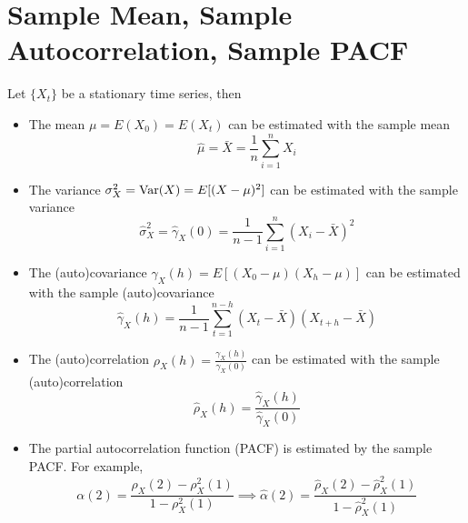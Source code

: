 \chapter{Sample Mean, Sample Autocorrelation, Sample PACF}

Let $\{X_t\}$ be a stationary time series, then 
\begin{itemize}
    \item The mean $\mu = E(X_0) = E(X_t)$ can be estimated with the sample mean
    \[\hat{\mu} = \bar{X} = \frac{1}{n}\sum_{i=1}^n X_i\]
    \item The variance $\sigma_X^2 = \operatorname{Var}(X) = E[(X-\mu)^2]$ can be estimated with the sample variance
    \[\hat{\sigma}_X^2 = \hat{\gamma}_X(0) = \frac{1}{n-1}\sum_{i=1}^n(X_i-\bar{X})^2\]
    \item The (auto)covariance $\gamma_X(h) = E[(X_0 - \mu)(X_h - \mu)]$ can be estimated with the sample (auto)covariance
    \[\hat{\gamma}_X(h) = \frac{1}{n-1}\sum_{t=1}^{n-h}(X_t - \bar{X})(X_{t+h} - \bar{X})\]
    \item The (auto)correlation $\rho_X(h) = \frac{\gamma_X(h)}{\gamma_X(0)}$ can be estimated with the sample (auto)correlation 
    \[\hat{\rho}_X(h) = \frac{\hat{\gamma}_X(h)}{\hat{\gamma}_X(0)}\]
    \item The partial autocorrelation function (PACF) is estimated by the sample PACF. For example,
    \[\alpha(2) = \frac{\rho_X(2) - \rho^2_X(1)}{1-\rho_X^2(1)} \implies \hat{\alpha}(2) = \frac{\hat{\rho}_X(2) - \hat{\rho}_X^2 (1)}{1 - \hat{\rho}_X^2(1)}\]
\end{itemize}